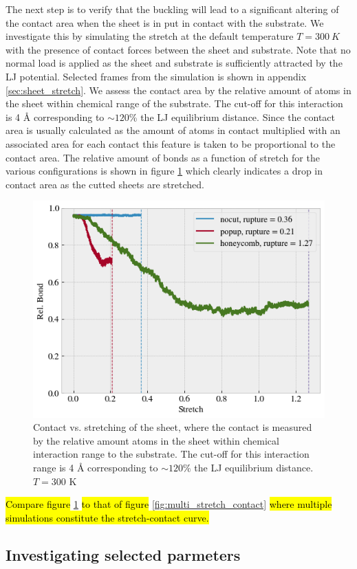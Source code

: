 The next step is to verify that the buckling will lead to a significant altering
of the contact area when the sheet is in put in contact with the substrate. We
investigate this by simulating the stretch at the default temperature $T =
\SI{300}{K}$ with the presence of contact forces between the sheet and
substrate. Note that no normal load is applied as the sheet and substrate is
sufficiently attracted by the LJ potential. Selected frames from the simulation is shown in appendix \ref{sec:sheet_stretch}. We assess the contact area by the
relative amount of atoms in the sheet within chemical range of the substrate.
The cut-off for this interaction is 4 Å corresponding to $\sim 120$\% the LJ
equilibrium distance. Since the contact area is usually calculated as the amount
of atoms in contact multiplied with an associated area for each contact this
feature is taken to be proportional to the contact area. The relative amount of
bonds as a function of stretch for the various configurations is shown in figure
\ref{fig:contact_vs_stretch} which clearly indicates a drop in contact area as
the cutted sheets are stretched. 

\begin{figure}[H]
  \centering
  \includegraphics[width=0.6\linewidth]{figures/baseline/contact_vs_stretch.png}
  \caption{Contact vs. stretching of the sheet, where the contact is measured by the relative amount atoms in the sheet within chemical interaction range to the substrate. The cut-off for this interaction range is 4 Å corresponding to $\sim 120 \%$ the LJ equilibrium distance. $T = 300$ K }
  \label{fig:contact_vs_stretch}
\end{figure}

\hl{Compare figure} \ref{fig:contact_vs_stretch} \hl{to that of figure} \ref{fig:multi_stretch_contact} \hl{where multiple simulations constitute the stretch-contact curve.}


\subsection{Investigating selected parmeters}

